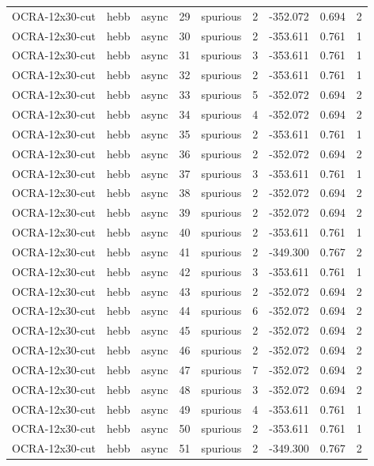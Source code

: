 \begin{tabular}{lllrlrrrr}
OCRA-12x30-cut & hebb & async & 29 & spurious & 2 & -352.072 & 0.694 & 2 \\
OCRA-12x30-cut & hebb & async & 30 & spurious & 2 & -353.611 & 0.761 & 1 \\
OCRA-12x30-cut & hebb & async & 31 & spurious & 3 & -353.611 & 0.761 & 1 \\
OCRA-12x30-cut & hebb & async & 32 & spurious & 2 & -353.611 & 0.761 & 1 \\
OCRA-12x30-cut & hebb & async & 33 & spurious & 5 & -352.072 & 0.694 & 2 \\
OCRA-12x30-cut & hebb & async & 34 & spurious & 4 & -352.072 & 0.694 & 2 \\
OCRA-12x30-cut & hebb & async & 35 & spurious & 2 & -353.611 & 0.761 & 1 \\
OCRA-12x30-cut & hebb & async & 36 & spurious & 2 & -352.072 & 0.694 & 2 \\
OCRA-12x30-cut & hebb & async & 37 & spurious & 3 & -353.611 & 0.761 & 1 \\
OCRA-12x30-cut & hebb & async & 38 & spurious & 2 & -352.072 & 0.694 & 2 \\
OCRA-12x30-cut & hebb & async & 39 & spurious & 2 & -352.072 & 0.694 & 2 \\
OCRA-12x30-cut & hebb & async & 40 & spurious & 2 & -353.611 & 0.761 & 1 \\
OCRA-12x30-cut & hebb & async & 41 & spurious & 2 & -349.300 & 0.767 & 2 \\
OCRA-12x30-cut & hebb & async & 42 & spurious & 3 & -353.611 & 0.761 & 1 \\
OCRA-12x30-cut & hebb & async & 43 & spurious & 2 & -352.072 & 0.694 & 2 \\
OCRA-12x30-cut & hebb & async & 44 & spurious & 6 & -352.072 & 0.694 & 2 \\
OCRA-12x30-cut & hebb & async & 45 & spurious & 2 & -352.072 & 0.694 & 2 \\
OCRA-12x30-cut & hebb & async & 46 & spurious & 2 & -352.072 & 0.694 & 2 \\
OCRA-12x30-cut & hebb & async & 47 & spurious & 7 & -352.072 & 0.694 & 2 \\
OCRA-12x30-cut & hebb & async & 48 & spurious & 3 & -352.072 & 0.694 & 2 \\
OCRA-12x30-cut & hebb & async & 49 & spurious & 4 & -353.611 & 0.761 & 1 \\
OCRA-12x30-cut & hebb & async & 50 & spurious & 2 & -353.611 & 0.761 & 1 \\
OCRA-12x30-cut & hebb & async & 51 & spurious & 2 & -349.300 & 0.767 & 2 \\

\end{tabular}
